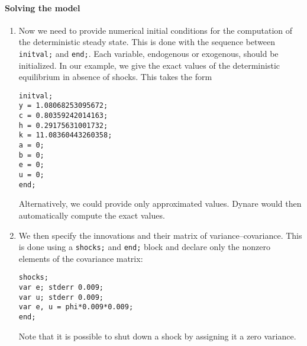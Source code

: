 \documentclass[11pt,a4paper]{article}
\begin{document}
\paragraph{Solving the model}
\begin{enumerate}
\item Now we need to provide numerical initial conditions for the computation of the deterministic steady state. This is done with the sequence between {\tt initval;} and {\tt end;}. Each variable, endogenous or exogenous, should be initialized. In our example, we give the exact values of the deterministic equilibrium in absence of shocks. This takes the form
\begin{verbatim}
initval;
y = 1.08068253095672;
c = 0.80359242014163;
h = 0.29175631001732;
k = 11.08360443260358;
a = 0;
b = 0;
e = 0;
u = 0;
end;
\end{verbatim}

Alternatively, we could provide only approximated values. {\sc Dynare} would then automatically compute the exact values.

\item We then specify the innovations and their matrix of variance--covariance. This is done using a {\tt shocks;} and {\tt end;} block and declare only the nonzero elements of the covariance matrix:
\begin{verbatim}
shocks;
var e; stderr 0.009;
var u; stderr 0.009;
var e, u = phi*0.009*0.009;
end;
\end{verbatim}
Note that it is possible to shut down a shock by assigning it a zero variance.


\end{enumerate}
\end{document}
